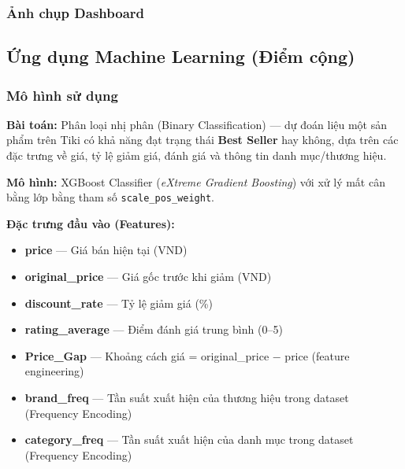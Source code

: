 \subsubsection{Ảnh chụp Dashboard}



\subsection{Ứng dụng Machine Learning (Điểm cộng)}

\subsubsection{Mô hình sử dụng}

\textbf{Bài toán:} Phân loại nhị phân (Binary Classification) — dự đoán liệu một sản phẩm trên Tiki có khả năng đạt trạng thái \textbf{Best Seller} hay không, dựa trên các đặc trưng về giá, tỷ lệ giảm giá, đánh giá và thông tin danh mục/thương hiệu.

\textbf{Mô hình:} XGBoost Classifier (\textit{eXtreme Gradient Boosting}) với xử lý mất cân bằng lớp bằng tham số \texttt{scale\_pos\_weight}.

\textbf{Đặc trưng đầu vào (Features):}
\begin{itemize}
    \item \textbf{price} — Giá bán hiện tại (VND)
    \item \textbf{original\_price} — Giá gốc trước khi giảm (VND)
    \item \textbf{discount\_rate} — Tỷ lệ giảm giá (\%)
    \item \textbf{rating\_average} — Điểm đánh giá trung bình (0–5)
    \item \textbf{Price\_Gap} — Khoảng cách giá = original\_price $-$ price (feature engineering)
    \item \textbf{brand\_freq} — Tần suất xuất hiện của thương hiệu trong dataset (Frequency Encoding)
    \item \textbf{category\_freq} — Tần suất xuất hiện của danh mục trong dataset (Frequency Encoding)
\end{itemize}

